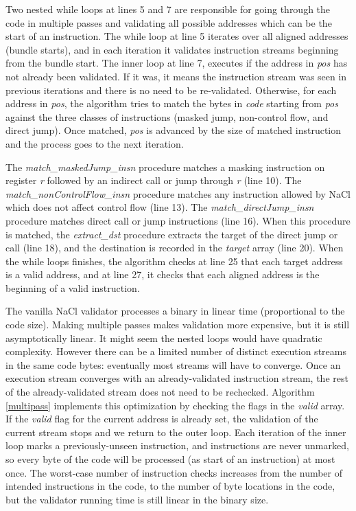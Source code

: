 \documentclass[conference]{IEEEtran}
\begin{document}
Two nested while loops at lines 5 and 7 are responsible for going through the code in multiple passes and  validating  all possible addresses which can be the start of an instruction. The while loop at line 5 iterates over all aligned addresses (bundle starts), and in each iteration it validates instruction streams beginning from the bundle start. The inner loop at line 7, executes  if the address in \textit{pos}  has not already been validated. If it was, it means the instruction stream was seen in previous iterations and there is no need to be re-validated. Otherwise,  for each address in \textit{pos}, the algorithm tries to match the  bytes in \textit{code} starting from \textit{pos}  against the three classes of instructions (masked jump, non-control flow, and direct jump). Once matched, \textit{pos} is advanced by the size of matched instruction and the process goes to the next iteration. 

The \textit{match\_maskedJump\_insn} procedure matches  a masking instruction on register \textit{r} followed by an indirect call or jump through \textit{r} (line 10). The \textit{match\_nonControlFlow\_insn} procedure matches any instruction allowed by NaCl which does not affect control flow (line 13). The \textit{match\_directJump\allowbreak\_insn} procedure matches direct call or jump instructions (line 16). When this procedure is matched, the \textit{extract\_dst} procedure extracts the target of the direct jump or call (line 18), and the destination is recorded in the \textit{target} array (line 20). When the while loops finishes, the algorithm checks at line 25 that each target address is a valid address, and at line 27, it checks that each aligned address is the beginning of a valid instruction.


The vanilla NaCl validator processes a binary in linear time
(proportional to the code size).
%
Making multiple passes makes validation more expensive, but it is
still asymptotically linear.
%
It might seem the nested loops would have quadratic complexity.
%
However there can be a limited number of distinct execution streams in
the same code bytes: eventually most streams will have to converge.
%
Once an execution stream converges with an already-validated
instruction stream, the rest of the already-validated stream does not
need to be rechecked.
%
Algorithm \ref{multipass} implements this optimization by checking the
flags in the {\em valid} array.
%
If the {\em valid} flag for the current address is already set, the
validation of the current stream stops and we return to the outer
loop.
%
Each iteration of the inner loop marks a previously-unseen
instruction, and instructions are never unmarked, so every byte of the
code will be processed (as start of an instruction) at most once.
%
The worst-case number of instruction checks increases from the number
of intended instructions in the code, to the number of byte locations
in the code, but the validator running time is still linear in the
binary size.
\end{document}
